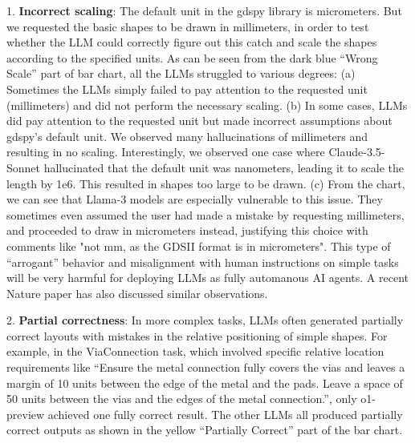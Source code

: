 \documentclass{article}
\begin{document}
  1. \textbf{Incorrect scaling}: The default unit in the gdspy library is micrometers. But we requested the basic shapes to be drawn in millimeters, in order to test whether the LLM could correctly figure out this catch and scale the shapes according to the specified units. As can be seen from the dark blue ``Wrong Scale'' part of bar chart, all the LLMs struggled to various degrees: (a) Sometimes the LLMs simply failed to pay attention to the requested unit (millimeters) and did not perform the necessary scaling. (b) In some cases, LLMs did pay attention to the requested unit but made incorrect assumptions about gdspy's default unit. We observed many hallucinations of millimeters and resulting in no scaling. Interestingly, we observed one case where Claude-3.5-Sonnet hallucinated that the default unit was nanometers, leading it to scale the length by 1e6. This resulted in shapes too large to be drawn. (c) From the chart, we can see that Llama-3 models are especially vulnerable to this issue. They sometimes even assumed the user had made a mistake by requesting millimeters, and proceeded to draw in micrometers instead, justifying this choice with comments like "not mm, as the GDSII format is in micrometers". This type of ``arrogant'' behavior and misalignment with human instructions on simple tasks will be very harmful for deploying LLMs as fully automanous AI agents. A recent Nature paper \cite{ZhouNature2024} has also discussed similar observations.
  
  2. \textbf{Partial correctness}: In more complex tasks, LLMs often generated partially correct layouts with mistakes in the relative positioning of simple shapes. For example, in the ViaConnection task, which involved specific relative location requirements like ``Ensure the metal connection fully covers the vias and leaves a margin of 10 units between the edge of the metal and the pads. Leave a space of 50 units between the vias and the edges of the metal connection.'', only o1-preview achieved one fully correct result. The other LLMs all produced partially correct outputs as shown in the yellow ``Partially Correct'' part of the bar chart.
  
\end{document}
